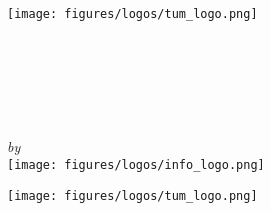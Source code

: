 \begin{titlepage}
    \makeatletter
    \begin{center}
        \texttt{[image: figures/logos/tum\_logo.png]}\\[0.5cm]
        \begin{Huge}
            \MakeUppercase{\getFaculty}
        \end{Huge}\\[0.5cm]
        \begin{large}
            \MakeUppercase{\getUniversity}
        \end{large}\\[2cm]
        \begin{Large}
            \getDoctype%
        \end{Large}\\[2cm]
        \begin{Huge}
            \@title\par
        \end{Huge}
        \vspace{5mm}
        \emph{by}\\
        \getAuthor
        \vfill
        \texttt{[image: figures/logos/info\_logo.png]}\\
    \end{center}
    \newpage
    \thispagestyle{empty}
    \begin{center}
        \texttt{[image: figures/logos/tum\_logo.png]}\\[0.5cm]
        \begin{Huge}
            \MakeUppercase{\getFaculty}
        \end{Huge}\\[0.5cm]
        \begin{large}
            \MakeUppercase{\getUniversity}
        \end{large}\\[2cm]
        \begin{Large}
            \getDoctype%
        \end{Large}\\[2cm]
        \begin{Huge}

\end{Huge}
\end{center}
\end{titlepage}
